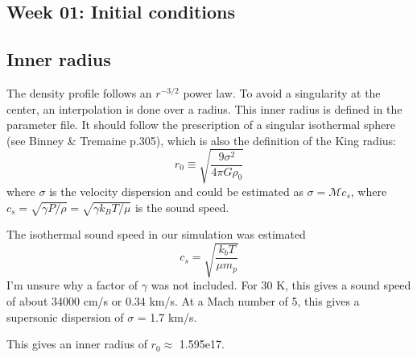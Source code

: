 \subsection*{Week 01: Initial conditions}

\subsection*{Inner radius}

The density profile follows an $r^{-3/2}$ power law. To avoid a singularity at the center, an interpolation is done over a radius. This inner radius is defined in the parameter file. It should follow the prescription of a singular isothermal sphere (see Binney \& Tremaine p.305\supercite{binney2008}), which is also the definition of the King radius:
\begin{equation}
r_0 \equiv \sqrt{\frac{9\sigma^2}{4\pi G\rho_0}}
\end{equation}
where $\sigma$ is the velocity dispersion and could be estimated as $\sigma = \mathcal{M} c_s$, where $c_s = \sqrt{\gamma P/\rho} = \sqrt{\gamma k_B T / \mu}$ is the sound speed.

The isothermal sound speed in our simulation was estimated
\begin{equation}
c_s = \sqrt{\frac{k_b T}{\mu m_p}}
\end{equation}
I'm unsure why a factor of $\gamma$ was not included. For 30 K, this gives a sound speed of about 34000 cm/s or 0.34 km/s. At a Mach number of 5, this gives a supersonic dispersion of $\sigma$ = 1.7 km/s.

This gives an inner radius of $r_0 \approx$ 1.595e17.
